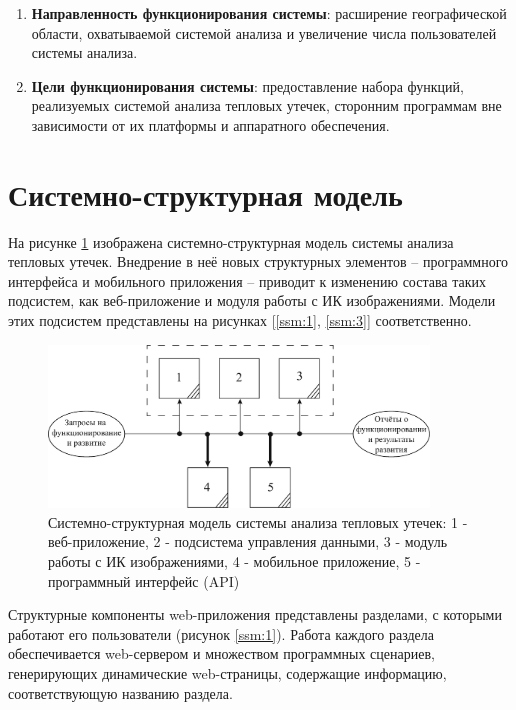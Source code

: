 \begin{enumerate}
	\item \textbf{Направленность функционирования системы}: расширение географической области, охватываемой системой анализа и увеличение числа пользователей системы анализа.

	\item \textbf{Цели функционирования системы}: предоставление набора функций, реализуемых системой анализа тепловых утечек, сторонним программам вне зависимости от их платформы и аппаратного обеспечения.

\end{enumerate}

\section{Системно-структурная модель}

\par 
	На рисунке \ref{ssm:0} изображена системно-структурная модель системы анализа тепловых утечек. Внедрение в неё новых структурных элементов -- программного интерфейса и мобильного приложения -- приводит к изменению состава таких подсистем, как веб-приложение и модуля работы с ИК изображениями. Модели этих подсистем представлены на рисунках [\ref{ssm:1}, \ref{ssm:3}] соответственно.

	 \begin{figure}[h!]
      \centering
      \includegraphics[width=0.9\textwidth]{images/ssm/0}
      \caption{Системно-структурная модель системы анализа тепловых утечек: 1 - веб-приложение, 2 - подсистема управления данными, 3 - модуль работы с ИК изображениями, 4 - мобильное приложение, 5 - программный интерфейс (API)}
      \label{ssm:0}
    \end{figure}

\pagebreak

\par 
	Структурные компоненты web-приложения представлены разделами, с которыми работают его пользователи (рисунок \ref{ssm:1}). Работа каждого раздела обеспечивается web-сервером и множеством программных сценариев, генерирующих динамические web-страницы, содержащие информацию, соответствующую названию раздела.

